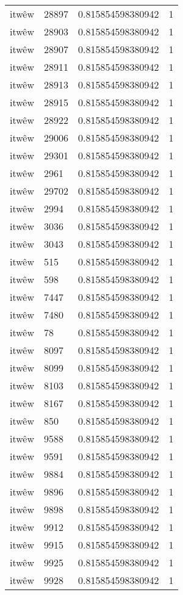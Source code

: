 \begin{longtable}{llll}
itwêw & 28897 & 0.815854598380942 & 1 \\
itwêw & 28903 & 0.815854598380942 & 1 \\
itwêw & 28907 & 0.815854598380942 & 1 \\
itwêw & 28911 & 0.815854598380942 & 1 \\
itwêw & 28913 & 0.815854598380942 & 1 \\
itwêw & 28915 & 0.815854598380942 & 1 \\
itwêw & 28922 & 0.815854598380942 & 1 \\
itwêw & 29006 & 0.815854598380942 & 1 \\
itwêw & 29301 & 0.815854598380942 & 1 \\
itwêw & 2961 & 0.815854598380942 & 1 \\
itwêw & 29702 & 0.815854598380942 & 1 \\
itwêw & 2994 & 0.815854598380942 & 1 \\
itwêw & 3036 & 0.815854598380942 & 1 \\
itwêw & 3043 & 0.815854598380942 & 1 \\
itwêw & 515 & 0.815854598380942 & 1 \\
itwêw & 598 & 0.815854598380942 & 1 \\
itwêw & 7447 & 0.815854598380942 & 1 \\
itwêw & 7480 & 0.815854598380942 & 1 \\
itwêw & 78 & 0.815854598380942 & 1 \\
itwêw & 8097 & 0.815854598380942 & 1 \\
itwêw & 8099 & 0.815854598380942 & 1 \\
itwêw & 8103 & 0.815854598380942 & 1 \\
itwêw & 8167 & 0.815854598380942 & 1 \\
itwêw & 850 & 0.815854598380942 & 1 \\
itwêw & 9588 & 0.815854598380942 & 1 \\
itwêw & 9591 & 0.815854598380942 & 1 \\
itwêw & 9884 & 0.815854598380942 & 1 \\
itwêw & 9896 & 0.815854598380942 & 1 \\
itwêw & 9898 & 0.815854598380942 & 1 \\
itwêw & 9912 & 0.815854598380942 & 1 \\
itwêw & 9915 & 0.815854598380942 & 1 \\
itwêw & 9925 & 0.815854598380942 & 1 \\
itwêw & 9928 & 0.815854598380942 & 1 \\

\end{longtable}
